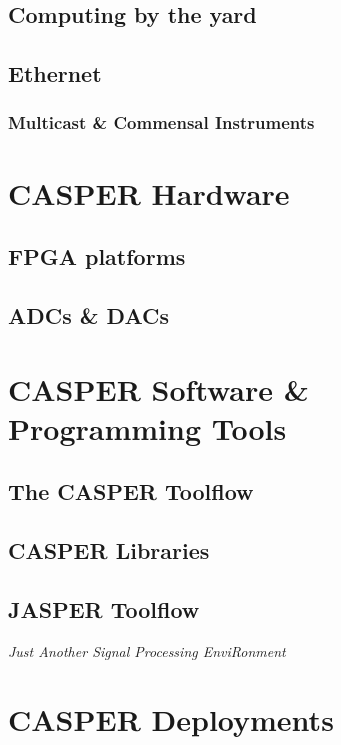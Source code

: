 \documentclass{ws-jai}
\begin{document}
\subsection{Computing by the yard}

\subsection{Ethernet}

\subsubsection{Multicast \& Commensal Instruments}


\section{CASPER Hardware} \label{sec:Hardware}

\subsection{FPGA platforms}

\subsection{ADCs \& DACs}


\section{CASPER Software \& Programming Tools} \label{sec:Software}

\subsection{The CASPER Toolflow} 

\subsection{CASPER Libraries}

\subsection{JASPER Toolflow}

\emph{Just Another Signal Processing EnviRonment}


\section{CASPER Deployments} \label{sec:Deployments}
\end{document}

